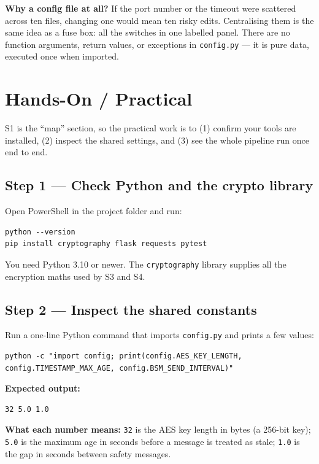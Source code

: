 \documentclass[11pt,a4paper]{article}
\begin{document}
\medskip
\noindent\textbf{Why a config file at all?} If the port number or the timeout
were scattered across ten files, changing one would mean ten risky edits.
Centralising them is the same idea as a fuse box: all the switches in one labelled
panel. There are no function arguments, return values, or exceptions in
\texttt{config.py} --- it is pure data, executed once when imported.

\section{Hands-On / Practical}

S1 is the ``map'' section, so the practical work is to (1) confirm your tools
are installed, (2) inspect the shared settings, and (3) see the whole pipeline
run once end to end.

\subsection{Step 1 --- Check Python and the crypto library}
Open PowerShell in the project folder and run:
\begin{lstlisting}[style=term]
python --version
pip install cryptography flask requests pytest
\end{lstlisting}
You need Python 3.10 or newer. The \texttt{cryptography} library supplies all
the encryption maths used by S3 and S4.

\subsection{Step 2 --- Inspect the shared constants}
Run a one-line Python command that imports \texttt{config.py} and prints a few
values:
\begin{lstlisting}[style=term]
python -c "import config; print(config.AES_KEY_LENGTH, config.TIMESTAMP_MAX_AGE, config.BSM_SEND_INTERVAL)"
\end{lstlisting}

\noindent\textbf{Expected output:}
\begin{lstlisting}[style=term]
32 5.0 1.0
\end{lstlisting}
\textbf{What each number means:} \texttt{32} is the AES key length in bytes (a
256-bit key); \texttt{5.0} is the maximum age in seconds before a message is
treated as stale; \texttt{1.0} is the gap in seconds between safety messages.
\end{document}
